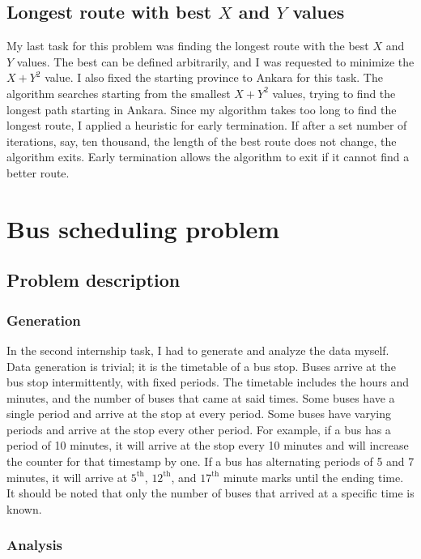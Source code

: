 \documentclass[12pt,a4paper]{article}
\begin{document}
\subsection{Longest route with best \(X\) and \(Y\) values}

My last task for this problem was finding the longest route with the best \(X\)
and \(Y\) values. The best can be defined arbitrarily, and I was requested to
minimize the \(X + Y^2\) value. I also fixed the starting province to Ankara for
this task. The algorithm searches starting from the smallest \(X + Y^2\) values,
trying to find the longest path starting in Ankara. Since my algorithm takes too
long to find the longest route, I applied a heuristic for early termination. If
after a set number of iterations, say, ten thousand, the length of the best
route does not change, the algorithm exits. Early termination allows the
algorithm to exit if it cannot find a better route.

\section{Bus scheduling problem}

\subsection{Problem description}

\subsubsection{Generation}

In the second internship task, I had to generate and analyze the data myself.
Data generation is trivial; it is the timetable of a bus stop. Buses arrive at
the bus stop intermittently, with fixed periods. The timetable includes the
hours and minutes, and the number of buses that came at said times. Some buses
have a single period and arrive at the stop at every period. Some buses have
varying periods and arrive at the stop every other period. For example, if a bus
has a period of 10 minutes, it will arrive at the stop every 10 minutes and will
increase the counter for that timestamp by one. If a bus has alternating periods
of 5 and 7 minutes, it will arrive at \(5^\text{th}\), \(12^\text{th}\), and
\(17^\text{th}\) minute marks until the ending time. It should be noted that
only the number of buses that arrived at a specific time is known.

\subsubsection{Analysis}
\end{document}
